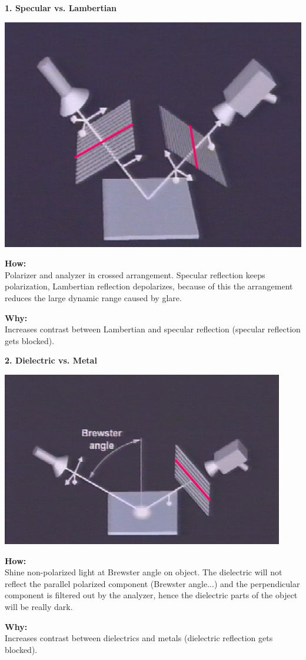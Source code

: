 \documentclass[a4paper, fontsize=8pt, landscape, DIV=1]{scrartcl}
\begin{document}
\begin{multicols*}{4}
		\textbf{1. Specular vs. Lambertian}\\
		\begin{center}
			\includegraphics[width=0.7\columnwidth]{images//ImageAcq/diffuse_specular.png}\\
		\end{center}
		\textbf{How:}\\
		Polarizer and analyzer in crossed arrangement. Specular reflection keeps polarization, Lambertian reflection depolarizes, because of this the arrangement reduces the large dynamic range caused by glare. 
		\par 
		\textbf{Why:}\\
		Increases contrast between Lambertian and specular reflection (specular reflection gets blocked).
		
		\textbf{2. Dielectric vs. Metal}\\
		\begin{center}
			\includegraphics[width=0.7\columnwidth]{images//ImageAcq/dielectric_metal.png}\\
		\end{center}
		\textbf{How:}\\
		Shine non-polarized light at Brewster angle on object. The dielectric will not reflect the parallel polarized component (Brewster angle...) and the perpendicular component is filtered out by the analyzer, hence the dielectric parts of the object will be really dark.  
		\par 
		\textbf{Why:}\\
		Increases contrast between dielectrics and metals (dielectric reflection gets blocked).
		\vfill\null
		\columnbreak
		

\end{multicols*}
\end{document}
